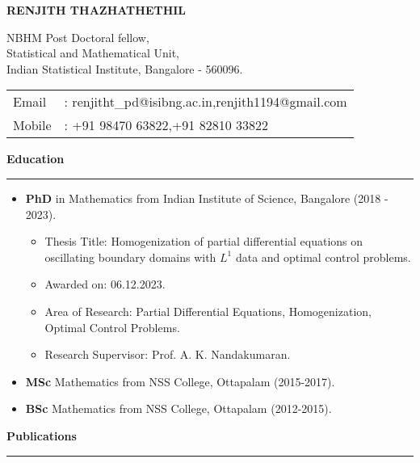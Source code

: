 \documentclass[a4paper,11pt]{letter}
\begin{document}
		
	\textbf{\Large RENJITH THAZHATHETHIL}\smallskip
	
	NBHM Post Doctoral fellow,\\
	Statistical and Mathematical Unit,\\
	Indian Statistical Institute, Bangalore - 560096.\smallskip
	
	\hspace*{-0.6em}\begin{tabular}{ll}
		Email&: renjitht\_pd@isibng.ac.in,\quad renjith1194@gmail.com\\
		Mobile&: +91 98470 63822,\quad +91 82810 33822
	\end{tabular}
	
	\textbf{\large Education}\smallskip\hrule
	
	\begin{itemize}
		\item \textbf{PhD} in Mathematics from Indian Institute of Science, Bangalore (2018 - 2023).
		\begin{itemize}
			\item Thesis Title: Homogenization of partial differential equations on oscillating boundary domains with $L^1$ data and optimal control problems.
			\item Awarded on: 06.12.2023.
			\item Area of Research: Partial Differential Equations, Homogenization, Optimal Control Problems.
			\item Research Supervisor: Prof. A. K. Nandakumaran.
		\end{itemize}
		\item \textbf{MSc} Mathematics from NSS College, Ottapalam (2015-2017).	
		
		\item \textbf{BSc} Mathematics from NSS College, Ottapalam (2012-2015). 
	\end{itemize}

	\textbf{\large Publications}\smallskip\hrule
	
\end{document}
